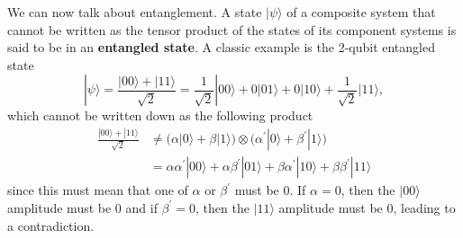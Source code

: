 \documentclass{article}
\theoremstyle{definition}
\begin{document}
We can now talk about entanglement. A state $|\psi\rangle$ of a composite system that cannot be written as the tensor product of the states of its component systems is said to be in an \textbf{entangled state}. A classic example is the 2-qubit entangled state
\[|\psi \rangle = \frac{|00\rangle + |11 \rangle}{\sqrt{2}} = \frac{1}{\sqrt{2}} |00\rangle + 0 |01\rangle + 0 |10\rangle + \frac{1}{\sqrt{2}} |11\rangle,\]
which cannot be written down as the following product
\begin{align*}
    \frac{|00\rangle + |11 \rangle}{\sqrt{2}} & \neq \big(\alpha |0\rangle + \beta |1\rangle \big) \otimes \big( \alpha^\prime |0 \rangle + \beta^\prime |1\rangle \big) \\
    & = \alpha \alpha^\prime |00\rangle + \alpha \beta^\prime |01\rangle + \beta \alpha^\prime |10\rangle + \beta \beta^\prime |11\rangle
\end{align*}
since this must mean that one of $\alpha$ or $\beta^\prime$ must be $0$. If $\alpha = 0$, then the $|00\rangle$ amplitude must be $0$ and if $\beta^\prime = 0$, then the $|11\rangle$ amplitude must be $0$, leading to a contradiction.
\end{document}
